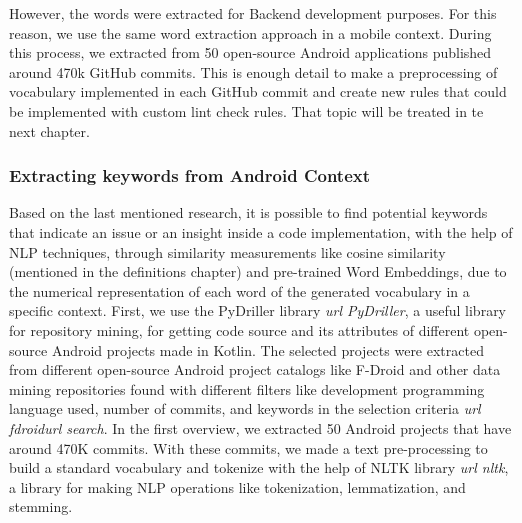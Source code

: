 However, the words were extracted for Backend development purposes. For this reason, we use the same word extraction approach in a mobile context. During this process, we extracted from 50 open-source Android applications published around 470k GitHub commits. This is enough detail to make a preprocessing of vocabulary implemented in each GitHub commit and create new rules that could be implemented with custom lint check rules. That topic will be treated in te next chapter.

\subsubsection{Extracting keywords from Android Context}
Based on the last mentioned research, it is possible to find potential keywords that indicate an issue or an insight inside a code implementation, with the help of NLP techniques, through similarity measurements like cosine similarity (mentioned in the definitions chapter) and pre-trained Word Embeddings, due to the numerical representation of each word of the generated vocabulary in a specific context. First, we use the PyDriller library \emph{url PyDriller}, a useful library for repository mining, for getting code source and its attributes of different open-source Android projects made in Kotlin. The selected projects were extracted from different open-source Android project catalogs like F-Droid and other data mining repositories found with different filters like development programming language used, number of commits, and keywords in the selection criteria \emph{url fdroid}\emph{url search}. In the first overview, we extracted 50 Android projects that have around 470K commits. With these commits, we made a text pre-processing to build a standard vocabulary and tokenize with the help of NLTK library \emph{url nltk}, a library for making NLP operations like tokenization, lemmatization, and stemming.

